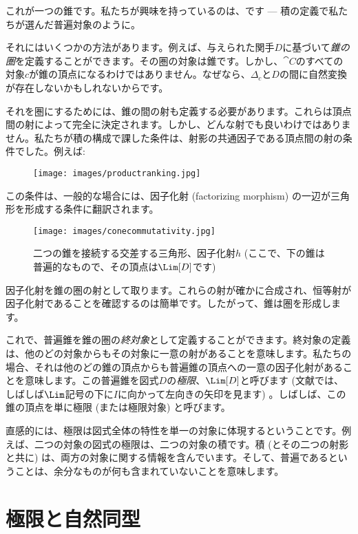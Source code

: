 \noindent
これが一つの錐です。私たちが興味を持っているのは、です --- 積の定義で私たちが選んだ普遍対象のように。

それにはいくつかの方法があります。例えば、与えられた関手$D$に基づいて\emph{錐の圏}を定義することができます。その圏の対象は錐です。しかし、$\cat{C}$のすべての対象$c$が錐の頂点になるわけではありません。なぜなら、$\Delta_c$と$D$の間に自然変換が存在しないかもしれないからです。

それを圏にするためには、錐の間の射も定義する必要があります。これらは頂点間の射によって完全に決定されます。しかし、どんな射でも良いわけではありません。私たちが積の構成で課した条件は、射影の共通因子である頂点間の射の条件でした。例えば: 


\begin{figure}[H]
  \centering
  \texttt{[image: images/productranking.jpg]}
\end{figure}

この条件は、一般的な場合には、因子化射 (factorizing morphism) の一辺が三角形を形成する条件に翻訳されます。

\begin{figure}[H]
  \centering
  \texttt{[image: images/conecommutativity.jpg]}
  \caption{二つの錐を接続する交差する三角形、因子化射$h$ (ここで、下の錐は普遍的なもので、その頂点は$\Lim[D]$です) }
\end{figure}

\noindent
因子化射を錐の圏の射として取ります。これらの射が確かに合成され、恒等射が因子化射であることを確認するのは簡単です。したがって、錐は圏を形成します。

これで、普遍錐を錐の圏の\emph{終対象}として定義することができます。終対象の定義は、他のどの対象からもその対象に一意の射があることを意味します。私たちの場合、それは他のどの錐の頂点からも普遍錐の頂点への一意の因子化射があることを意味します。この普遍錐を図式$D$の\emph{極限}、$\Lim[D]$と呼びます (文献では、しばしば$\Lim$記号の下に$I$に向かって左向きの矢印を見ます) 。しばしば、この錐の頂点を単に極限 (または極限対象) と呼びます。

直感的には、極限は図式全体の特性を単一の対象に体現するということです。例えば、二つの対象の図式の極限は、二つの対象の積です。積 (とその二つの射影と共に) は、両方の対象に関する情報を含んでいます。そして、普遍であるということは、余分なものが何も含まれていないことを意味します。

\section{極限と自然同型}

